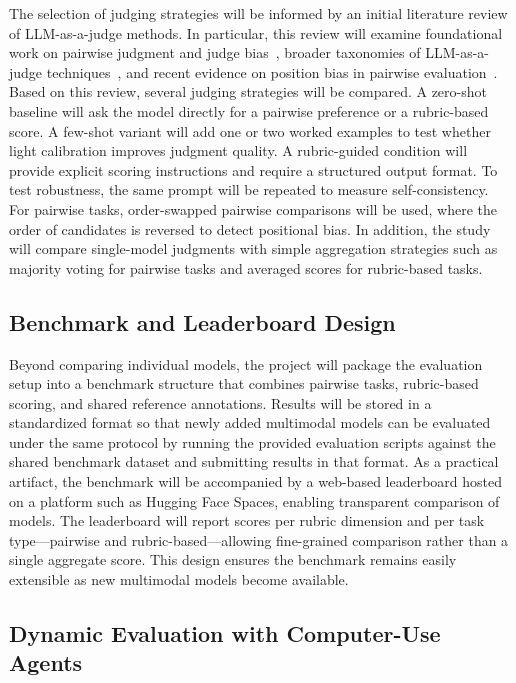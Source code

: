 \documentclass[pdflatex,sn-mathphys-num]{sn-jnl}
\begin{document}
The selection of judging strategies will be informed by an initial literature review of
LLM-as-a-judge methods. In particular, this review will examine foundational work on
pairwise judgment and judge bias~\cite{llm_judge}, broader taxonomies of
LLM-as-a-judge techniques~\cite{li-etal-2025-generation}, and recent evidence on
position bias in pairwise evaluation~\cite{shi-etal-2025-judging}. Based on this
review, several judging strategies will be compared. A zero-shot baseline will ask the
model directly for a pairwise preference or a rubric-based score. A few-shot variant
will add one or two worked examples to test whether light calibration improves judgment
quality. A rubric-guided condition will provide explicit scoring instructions and
require a structured output format. To test robustness, the same prompt will be
repeated to measure self-consistency. For pairwise tasks, order-swapped pairwise
comparisons will be used, where the order of candidates is reversed to detect
positional bias. In addition, the study will compare single-model judgments with simple
aggregation strategies such as majority voting for pairwise tasks and averaged scores
for rubric-based tasks.

\subsection{Benchmark and Leaderboard Design}

Beyond comparing individual models, the project will package the evaluation setup into
a benchmark structure that combines pairwise tasks, rubric-based scoring, and shared
reference annotations. Results will be stored in a standardized format so that newly
added multimodal models can be evaluated under the same protocol by running the
provided evaluation scripts against the shared benchmark dataset and submitting results
in that format. As a practical artifact, the benchmark will be accompanied by a
web-based leaderboard hosted on a platform such as Hugging Face Spaces, enabling
transparent comparison of models. The leaderboard will report scores per rubric
dimension and per task type---pairwise and rubric-based---allowing fine-grained
comparison rather than a single aggregate score. This design ensures the benchmark
remains easily extensible as new multimodal models become available.

\subsection{Dynamic Evaluation with Computer-Use Agents}
\end{document}
